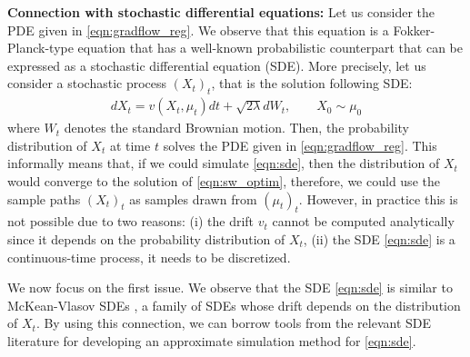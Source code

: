 \textbf{Connection with stochastic differential equations: }
%
Let us consider the PDE given in \eqref{eqn:gradflow_reg}. We observe that this equation is a Fokker-Planck-type equation \cite{bogachev2015fokker} that has a well-known probabilistic counterpart that can be expressed as a stochastic differential equation (SDE). More precisely, let us consider a stochastic process $(X_t)_{t}$, that is the solution following SDE:
\begin{align}
d X_t = v(X_t,\mu_t) dt + \sqrt{2 \lambda } d W_t, \qquad X_0 \sim \mu_0 \label{eqn:sde}
\end{align}
where $W_t$ denotes the standard Brownian motion. Then, the probability distribution of $X_t$ at time $t$ solves the PDE given in \eqref{eqn:gradflow_reg}. This informally means that, if we could simulate \eqref{eqn:sde}, then the distribution of $X_t$ would converge to the solution of \eqref{eqn:sw_optim}, therefore, we could use the sample paths $(X_t)_t$ as samples drawn from $(\mu_t)_t$. However, in practice this is not possible due to two reasons: (i) the drift $v_t$ cannot be computed analytically since it depends on the probability distribution of $X_t$, (ii) the SDE \eqref{eqn:sde} is a continuous-time process, it needs to be discretized.







We now focus on the first issue.
We observe that the SDE \eqref{eqn:sde} is similar to McKean-Vlasov SDEs \cite{veretennikov2006ergodic,mishura2016existence}, a family of SDEs whose drift depends on the distribution of $X_t$. By using this connection, we can borrow tools from the relevant SDE literature \cite{malrieu03,cgm-08} for developing an approximate simulation method for \eqref{eqn:sde}.

